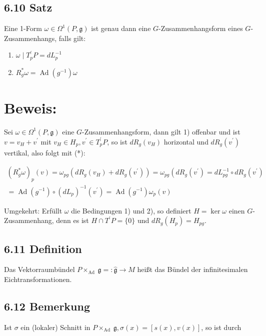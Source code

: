 \documentclass[10pt, letterpaper]{article}
\begin{document}
\subsection*{6.10 Satz}
Eine 1-Form $\omega \in \Omega^{1}(P, \mathfrak{g})$ ist genau dann eine $G$-Zusammenhangsform eines $G$-Zusammenhangs, falls gilt:

\begin{enumerate}
  \item $\omega \mid T_{p}^{\prime} P=d L_{p}^{-1}$
  \item $R_{g}^{*} \omega=\operatorname{Ad}\left(g^{-1}\right) \omega$
\end{enumerate}

\section*{Beweis:}
Sei $\omega \in \Omega^{1}(P, \mathfrak{g})$ eine $G$-Zusammenhangsform, dann gilt 1) offenbar und ist $v=v_{H}+v^{\prime}$ mit $v_{H} \in H_{p}, v^{\prime} \in T_{p}^{\prime} P$, so ist $d R_{g}\left(v_{H}\right)$ horizontal und $d R_{g}\left(v^{\prime}\right)$ vertikal, also folgt mit (*):

$$
\begin{gathered}
\left(R_{g}^{*} \omega\right)_{p}(v)=\omega_{p g}\left(d R_{g}\left(v_{H}\right)+d R_{g}\left(v^{\prime}\right)\right)=\omega_{p g}\left(d R_{g}\left(v^{\prime}\right)=d L_{p g}^{-1} \circ d R_{g}\left(v^{\prime}\right)\right. \\
=\operatorname{Ad}\left(g^{-1}\right) \circ\left(d L_{p}\right)^{-1}\left(v^{\prime}\right)=\operatorname{Ad}\left(g^{-1}\right) \omega_{p}(v)
\end{gathered}
$$

Umgekehrt: Erfüllt $\omega$ die Bedingungen 1) und 2), so definiert $H=\operatorname{ker} \omega$ einen $G$-Zusammenhang, denn es ist $H \cap T^{\prime} P=\{0\}$ und $d R_{g}\left(H_{p}\right)=H_{p g}$.

\subsection*{6.11 Definition}
Das Vektorraumbündel $P \times_{\text {Ad }} \mathfrak{g}=: \hat{\mathfrak{g}} \rightarrow M$ heißt das Bündel der infinitesimalen Eichtransformationen.

\subsection*{6.12 Bemerkung}
Ist $\sigma$ ein (lokaler) Schnitt in $P \times_{\text {Ad }} \mathfrak{g}, \sigma(x)=[s(x), v(x)]$, so ist durch
\end{document}
